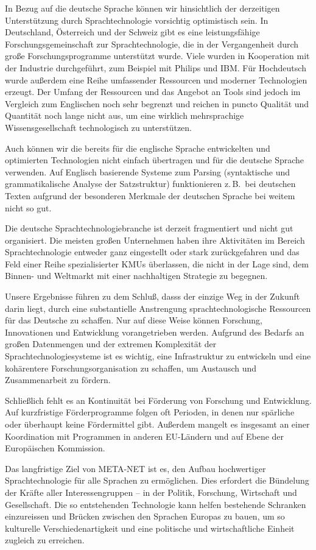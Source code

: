 \documentclass[]{../../metanetpaper}
\begin{document}
\begin{multicols}{2}
In Bezug auf die deutsche Sprache können wir hinsichtlich der derzeitigen Unterstützung durch Sprachtechnologie vorsichtig optimistisch sein. In Deutschland, Österreich und der Schweiz gibt es eine leistungsfähige Forschungsgemeinschaft zur Sprachtechnologie, die in der Vergangenheit durch große Forschungsprogramme unterstützt wurde. Viele wurden in Kooperation mit der Industrie durchgeführt, zum Beispiel mit Philips und IBM. Für Hochdeutsch wurde außerdem eine Reihe umfassender Ressourcen und moderner Technologien erzeugt. Der Umfang der Ressourcen und das Angebot an Tools sind jedoch im Vergleich zum Englischen noch sehr begrenzt und reichen in puncto Qualität und Quantität noch lange nicht aus, um eine wirklich mehrsprachige Wissensgesellschaft technologisch zu unterstützen.

Auch können wir die bereits für die englische Sprache entwickelten und optimierten Technologien nicht einfach übertragen und für die deutsche Sprache verwenden. Auf Englisch basierende Systeme zum Parsing (syntaktische und grammatikalische Analyse der Satzstruktur) funktionieren z.\,B.~bei deutschen Texten aufgrund der besonderen Merkmale der deutschen Sprache bei weitem nicht so gut.

Die deutsche Sprachtechnologiebranche  ist derzeit fragmentiert und nicht gut organisiert. Die meisten großen Unternehmen haben ihre Aktivitäten im Bereich Sprachtechnologie entweder ganz eingestellt oder stark zurückgefahren und das Feld einer Reihe spezialisierter KMUs überlassen, die nicht in der Lage sind, dem Binnen- und Weltmarkt mit einer nachhaltigen Strategie zu begegnen. 

Unsere Ergebnisse führen zu dem Schluß, dasss der einzige Weg in der Zukunft darin liegt, durch eine substantielle Anstrengung sprachtechnologische Ressourcen für das Deutsche zu schaffen. Nur auf diese Weise können Forschung, Innovationen und Entwicklung vorangetrieben werden. Aufgrund des Bedarfs an großen Datenmengen und der extremen Komplexität der Sprachtechnologiesysteme ist es wichtig, eine Infrastruktur zu entwickeln und eine kohärentere Forschungsorganisation zu schaffen, um Austausch und Zusammenarbeit zu fördern.

Schließlich fehlt es an Kontinuität bei Förderung von Forschung und Entwicklung. Auf kurzfristige Förderprogramme folgen oft Perioden, in denen nur spärliche oder überhaupt keine Fördermittel gibt. Außerdem mangelt es insgesamt an einer Koordination mit Programmen in anderen EU-Ländern und auf Ebene der Europäischen Kommission.

Das langfristige Ziel von META-NET ist es, den Aufbau hochwertiger Sprachtechnologie für alle Sprachen zu ermöglichen. Dies erfordert die Bündelung der Kräfte aller Interessengruppen – in der Politik, Forschung, Wirtschaft und Gesellschaft. Die so entstehenden Technologie kann helfen bestehende Schranken einzureissen und Brücken zwischen den Sprachen Europas zu bauen, um so kulturelle Verschiedenartigkeit und eine politische und wirtschaftliche Einheit zugleich zu erreichen. 
\end{multicols}
\end{document}
